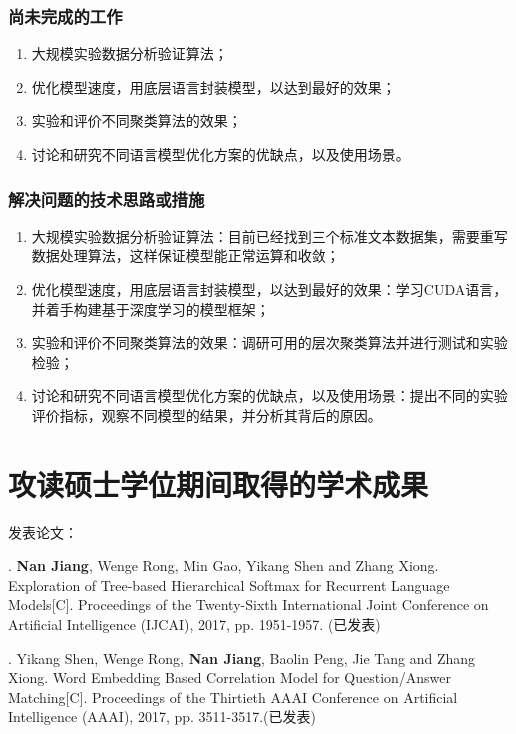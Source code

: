 \documentclass[master,openright,twoside,color]{buaathesis}
\begin{document}
\subsection{尚未完成的工作}
\begin{enumerate}
\item 大规模实验数据分析验证算法；
\item 优化模型速度，用底层语言封装模型，以达到最好的效果；
\item 实验和评价不同聚类算法的效果；
\item 讨论和研究不同语言模型优化方案的优缺点，以及使用场景。
\end{enumerate}
\subsection{解决问题的技术思路或措施}
\begin{enumerate}
\item 大规模实验数据分析验证算法：目前已经找到三个标准文本数据集，需要重写数据处理算法，这样保证模型能正常运算和收敛；
\item 优化模型速度，用底层语言封装模型，以达到最好的效果：学习CUDA语言，并着手构建基于深度学习的模型框架；
\item 实验和评价不同聚类算法的效果：调研可用的层次聚类算法并进行测试和实验检验；
\item 讨论和研究不同语言模型优化方案的优缺点，以及使用场景：提出不同的实验评价指标，观察不同模型的结果，并分析其背后的原因。
\end{enumerate}
\cleardoublepage
{}
{}
\nocite{*}

\cleardoublepage


\backmatter

\chapter{攻读硕士学位期间取得的学术成果}
\noindent 发表论文：

. \textbf{Nan Jiang}, Wenge Rong, Min Gao, Yikang Shen and Zhang Xiong. Exploration of Tree-based Hierarchical Softmax for Recurrent Language Models[C]. Proceedings of the Twenty-Sixth International Joint Conference on Artificial Intelligence (IJCAI), 2017, pp. 1951-1957. (已发表)

. Yikang Shen, Wenge Rong, \textbf{Nan Jiang}, Baolin Peng, Jie Tang and Zhang Xiong. Word Embedding Based Correlation Model for Question/Answer Matching[C]. Proceedings of the Thirtieth {AAAI} Conference on Artificial Intelligence (AAAI), 2017, pp. 3511-3517.(已发表)
\end{document}
